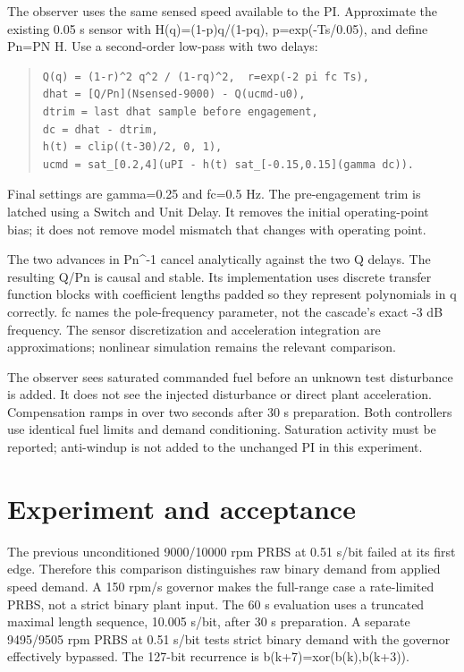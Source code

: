 The observer uses the same sensed speed available to the PI. Approximate the
existing 0.05 s sensor with H(q)=(1-p)q/(1-pq), p=exp(-Ts/0.05), and define
Pn=PN H. Use a second-order low-pass with two delays:

\begin{quote}\footnotesize
\begin{verbatim}
Q(q) = (1-r)^2 q^2 / (1-rq)^2,  r=exp(-2 pi fc Ts),
dhat = [Q/Pn](Nsensed-9000) - Q(ucmd-u0),
dtrim = last dhat sample before engagement,
dc = dhat - dtrim,
h(t) = clip((t-30)/2, 0, 1),
ucmd = sat_[0.2,4](uPI - h(t) sat_[-0.15,0.15](gamma dc)).
\end{verbatim}
\end{quote}
Final settings are gamma=0.25 and fc=0.5 Hz. The pre-engagement trim is latched
using a Switch and Unit Delay. It removes the initial operating-point bias;
it does not remove model mismatch that changes with operating point.

The two advances in Pn\textasciicircum{}-1 cancel analytically against the two Q delays. The
resulting Q/Pn is causal and stable. Its implementation uses discrete transfer
function blocks with coefficient lengths padded so they represent polynomials
in q correctly. fc names the pole-frequency parameter, not the cascade's exact
-3 dB frequency. The sensor discretization and acceleration integration are
approximations; nonlinear simulation remains the relevant comparison.

The observer sees saturated commanded fuel before an unknown test disturbance
is added. It does not see the injected disturbance or direct plant acceleration.
Compensation ramps in over two seconds after 30 s preparation. Both controllers use identical
fuel limits and demand conditioning. Saturation activity must be reported;
anti-windup is not added to the unchanged PI in this experiment.

\section{Experiment and acceptance}

The previous unconditioned 9000/10000 rpm PRBS at 0.51 s/bit failed at its first
edge. Therefore this comparison distinguishes raw binary demand from applied
speed demand. A 150 rpm/s governor makes the full-range case a rate-limited PRBS,
not a strict binary plant input. The 60 s evaluation uses a truncated maximal
length sequence, 10.005 s/bit, after 30 s preparation. A separate 9495/9505 rpm
PRBS at 0.51 s/bit tests strict binary demand with the governor effectively
bypassed. The 127-bit recurrence is b(k+7)=xor(b(k),b(k+3)).

